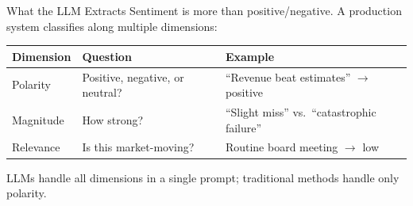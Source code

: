 \documentclass[aspectratio=169]{beamer}
\begin{document}
\begin{frame}{What the LLM Extracts}
Sentiment is more than positive/negative. A production system classifies along multiple dimensions:
\vspace{0.3cm}
\begin{center}
\small
\begin{tabular}{@{} l l l @{}}
\toprule
\textbf{Dimension} & \textbf{Question} & \textbf{Example} \\
\midrule
Polarity & Positive, negative, or neutral? & ``Revenue beat estimates'' $\rightarrow$ positive \\
Magnitude & How strong? & ``Slight miss'' vs.\ ``catastrophic failure'' \\
Relevance & Is this market-moving? & Routine board meeting $\rightarrow$ low \\
\bottomrule
\end{tabular}
\end{center}
\vspace{0.3cm}
\begin{center}
\alert{LLMs handle all dimensions in a single prompt; traditional methods handle only polarity.}
\end{center}
\end{frame}
\end{document}
